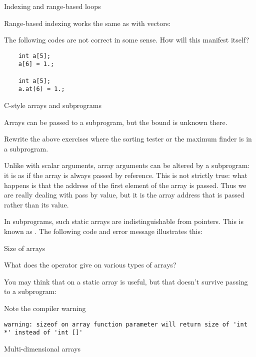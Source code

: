  {Indexing and range-based loops}

Range-based indexing works the same as with vectors:
%

\begin{review}
  The following codes are not correct in some sense. How will this manifest itself?
  \begin{lstlisting}
    int a[5];
    a[6] = 1.;

    int a[5];
    a.at(6) = 1.;
  \end{lstlisting}
\end{review}

 {C-style arrays and subprograms}

Arrays can be passed to a subprogram, but the bound is unknown there.
%
%
\begin{exercise}
  Rewrite the above exercises where the sorting tester or the maximum
  finder is in a subprogram.
\end{exercise}

Unlike with scalar arguments, array arguments can be altered by a
subprogram: it is as if the array is always passed by reference. This is
not strictly true: what happens is that the address of the first
element of the array is passed. Thus we are really dealing with pass
by value, but it is the array address that is passed rather than its value.

In subprograms, such static arrays are indistinguishable from pointers.
This is known as .
The following code and error message illustrates this:
%

 {Size of arrays}

What does the  operator give on various types of arrays?


You may think that  on a static array is useful,
but that doesn't survive passing to a subprogram:


Note the compiler warning
\begin{verbatim}
warning: sizeof on array function parameter will return size of 'int *' instead of 'int []'
\end{verbatim}

 {Multi-dimensional arrays}

